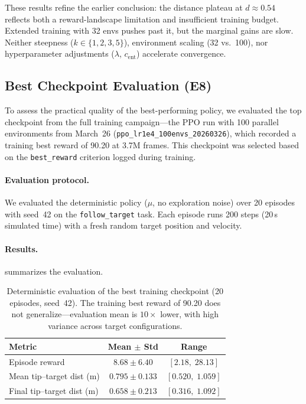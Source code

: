 \documentclass[11pt]{article}
\begin{document}
These results refine the earlier conclusion: the distance plateau at $d \approx 0.54$ reflects both a reward-landscape limitation and insufficient training budget. Extended training with 32 envs pushes past it, but the marginal gains are slow. Neither steepness ($k \in \{1,2,3,5\}$), environment scaling (32 vs.\ 100), nor hyperparameter adjustments ($\lambda$, $c_{\text{ent}}$) accelerate convergence.

\subsection{Best Checkpoint Evaluation (E8)}
\label{sec:reward:eval}

To assess the practical quality of the best-performing policy, we evaluated the top checkpoint from the full training campaign---the PPO run with 100 parallel environments from March~26 (\texttt{ppo\_lr1e4\_100envs\_20260326}), which recorded a training best reward of 90.20 at 3.7M frames.
This checkpoint was selected based on the \texttt{best\_reward} criterion logged during training.

\paragraph{Evaluation protocol.}
We evaluated the deterministic policy ($\mu$, no exploration noise) over 20 episodes with seed~42 on the \texttt{follow\_target} task.
Each episode runs 200 steps (20\,s simulated time) with a fresh random target position and velocity.

\paragraph{Results.}
 summarizes the evaluation.

\begin{table}[H]
  \centering
  \small
  \renewcommand{\arraystretch}{1.3}
  \caption{Deterministic evaluation of the best training checkpoint (20 episodes, seed~42). The training best reward of 90.20 does not generalize---evaluation mean is $10\times$ lower, with high variance across target configurations.}
  \label{tab:eval-best}
  \begin{tabular}{@{}lcc@{}}
    \toprule
    \textbf{Metric} & \textbf{Mean $\pm$ Std} & \textbf{Range} \\
    \midrule
    Episode reward     & $8.68 \pm 6.40$ & $[2.18,\; 28.13]$ \\
    Mean tip--target dist (m)  & $0.795 \pm 0.133$ & $[0.520,\; 1.059]$ \\
    Final tip--target dist (m) & $0.658 \pm 0.213$ & $[0.316,\; 1.092]$ \\
    \bottomrule
  \end{tabular}
\end{table}
\end{document}
